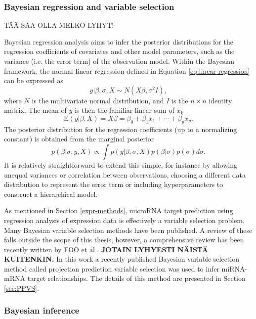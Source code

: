 \subsubsection{Bayesian regression and variable selection}

TÄÄ SAA OLLA MELKO LYHYT!

Bayesian regression analysis aims to infer the posterior distributions
for the regression coefficients of covariates and other model parameters,
such as the variance (i.e. the error term) of the observation model.
Within the Bayesian framework, the normal linear regression defined in
Equation \ref{eq:linear-regression} can be expressed as
\begin{equation}
  y | \beta, \sigma, X \sim N(X \beta, \sigma^2I),
\end{equation}
where $N$ is the multivariate normal distribution, and $I$ is the $n \times n$
identity matrix. The mean of $y$ is then the familiar linear sum of $x_k$
\begin{equation}
  \textrm{E}(y|\beta,X) = X \beta = \beta_0 + \beta_1 x_1 + \dotsb + \beta_p x_p.
\end{equation}
The posterior distribution for the regression coefficients (up to a
normalizing constant) is obtained from the marginal posterior
\begin{equation}
  p(\beta | \sigma, y, X) \propto \int p(y | \beta, \sigma, X) p(\beta | \sigma) p(\sigma) d\sigma.
\end{equation}
It is relatively straightforward to extend this simple, for instance by
allowing unequal variances or correlation between observations, choosing a
different data distribution
to represent the error term or including hyperparameters to construct a
hierarchical model.

As mentioned in Section \ref{expr-methods}, microRNA target prediction using
regression analysis of expression data is effectively a variable selection
problem. Many Bayesian variable selection methods have been published. A
review of these falls outside the scope of this thesis, however, a
comprehensive review has been recently written by FOO et al \citep{}.
\textbf{JOTAIN LYHYESTI NÄISTÄ KUITENKIN.}
In this work a recently published Bayesian variable selection method called
projection prediction variable selection was used to infer miRNA-mRNA
target relationships. The details of this method
are presented in Section \ref{sec:PPVS}.



\subsubsection{Bayesian inference}\label{simulation}

